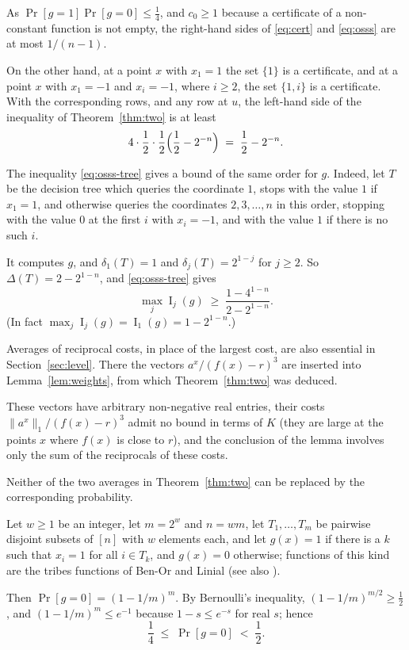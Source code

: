 \documentclass[11pt,reqno]{amsart}
\theoremstyle{definition}
\theoremstyle{remark}
\numberwithin{equation}{section}
\theoremstyle{named}
\theoremstyle{plain}
\newcommand{\I}{\operatorname{I}}
\newcommand{\norm}[1]{\lVert #1\rVert_1}
\begin{document}
As $\Pr[g=1]\Pr[g=0]\le\frac14$, and $c_0\ge1$ because a certificate of a
non-constant function is not empty, the right-hand sides of \eqref{eq:cert} and \eqref{eq:osss} are
at most $1/(n-1)$.

On the other hand, at a point $x$ with $x_1=1$ the set $\{1\}$ is a certificate,
and at a point $x$ with $x_1=-1$ and $x_i=-1$, where $i\ge2$, the set $\{1,i\}$ is a certificate.
With the corresponding rows, and any row at $u$, the left-hand side of the inequality of
Theorem~\ref{thm:two} is at least
\[
   4\cdot\frac12\cdot\frac12\Bigl(\frac12-2^{-n}\Bigr)\;=\;\frac12-2^{-n}.
\]

The inequality
\eqref{eq:osss-tree} gives a bound of the same order for $g$. Indeed, let $T$ be the decision tree
which queries the coordinate $1$, stops with the value $1$ if $x_1=1$, and otherwise queries the
coordinates $2,3,\dots,n$ in this order, stopping with the value $0$ at the first $i$ with $x_i=-1$,
and with the value $1$ if there is no such $i$.

It computes $g$, and $\delta_1(T)=1$ and
$\delta_j(T)=2^{1-j}$ for $j\ge2$. So $\Delta(T)=2-2^{1-n}$, and \eqref{eq:osss-tree} gives
\[
   \max_j\I_j(g)\;\ge\;\frac{1-4^{1-n}}{2-2^{1-n}}.
\]
(In fact $\max_j\I_j(g)=\I_1(g)=1-2^{1-n}$.)

Averages of reciprocal costs, in place of the largest cost, are also essential in
Section~\ref{sec:level}. There the vectors $a^{x}/(f(x){-}r)^{3}$ are inserted into
Lemma~\ref{lem:weights}, from which Theorem~\ref{thm:two} was deduced.

These vectors have arbitrary non-negative
real entries, their costs $\norm{a^{x}}/(f(x)-r)^{3}$ admit no bound in terms of $K$ (they are
large at the points $x$ where $f(x)$ is close to $r$), and the conclusion of the lemma involves
only the sum of the reciprocals of these costs.

Neither of the two averages in Theorem~\ref{thm:two} can be replaced by the corresponding probability.

Let $w\ge1$ be an integer, let $m=2^{w}$ and $n=wm$, let $T_1,\dots,T_m$ be pairwise disjoint subsets of
$[n]$ with $w$ elements each, and let $g(x)=1$ if there is a $k$ such that $x_i=1$ for all $i\in T_k$,
and $g(x)=0$ otherwise; functions of this kind are the tribes functions of Ben-Or and Linial
\cite{BL} (see also \cite{OSSS}).

Then
$\Pr[g=0]=(1-1/m)^{m}$. By Bernoulli's inequality,
$(1-1/m)^{m/2}\ge\frac12$, and $(1{-}1/m)^{m}\le e^{-1}$ because $1-s\le e^{-s}$ for real $s$; hence
\[
   \frac14\;\le\;\Pr[g=0]\;<\;\frac12 .
\]
\end{document}
